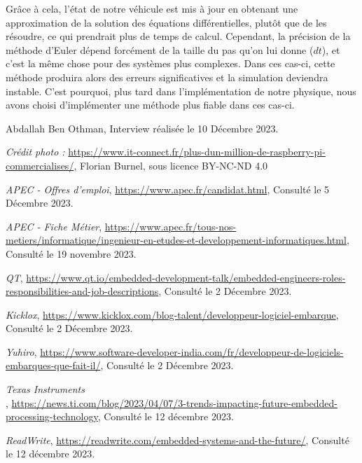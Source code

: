 \documentclass[a4paper,12pt]{report}
\begin{document}
    Grâce à cela, l'état de notre véhicule est mis à jour en obtenant une approximation de la solution des équations différentielles, plutôt que de les résoudre, ce qui prendrait plus de temps de calcul.
    Cependant, la précision de la méthode d'Euler dépend forcément de la taille du pas qu'on lui donne ($dt$), et c'est la même chose pour des systèmes plus complexes. Dans ces cas-ci, cette méthode produira alors des erreurs significatives et la simulation deviendra instable. C'est pourquoi, plus tard dans l'implémentation de notre physique, nous avons choisi d'implémenter une méthode plus fiable dans ces cas-ci.







    \begin{thebibliography}{99}
        Abdallah Ben Othman,
        Interview réalisée le 10 Décembre 2023.

        \emph{Crédit photo :}
        \url{https://www.it-connect.fr/plus-dun-million-de-raspberry-pi-commercialises/},
        Florian Burnel, sous licence BY-NC-ND 4.0

        \emph{APEC - Offres d'emploi},
        \url{https://www.apec.fr/candidat.html},
        Consulté le 5 Décembre 2023.

        \emph{APEC - Fiche Métier},
        \url{https://www.apec.fr/tous-nos-metiers/informatique/ingenieur-en-etudes-et-developpement-informatiques.html},
        Consulté le 19 novembre 2023.

        \emph{QT},
        \url{https://www.qt.io/embedded-development-talk/embedded-engineers-roles-responsibilities-and-job-descriptions},
        Consulté le 2 Décembre 2023.

        \emph{Kicklox},
        \url{https://www.kicklox.com/blog-talent/developpeur-logiciel-embarque},
        Consulté le 2 Décembre 2023.

        \emph{Yuhiro},
        \url{https://www.software-developer-india.com/fr/developpeur-de-logiciels-embarques-que-fait-il/},
        Consulté le 2 Décembre 2023.

        \emph{Texas Instruments\\},
        \url{https://news.ti.com/blog/2023/04/07/3-trends-impacting-future-embedded-processing-technology},
        Consulté le 12 décembre 2023.

        \emph{ReadWrite},
        \url{https://readwrite.com/embedded-systems-and-the-future/},
        Consulté le 12 décembre 2023.

    \end{thebibliography}
\end{document}
